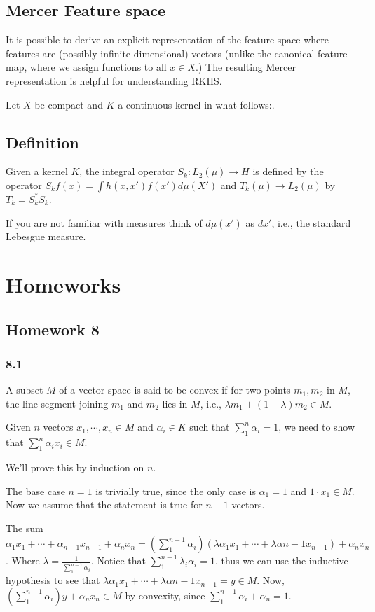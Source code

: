 \documentclass[11pt]{article}
\begin{document}
\subsection{Mercer Feature space}
\label{sec:orgb5b0f57}
It is possible to derive an explicit representation of the feature space
where features are (possibly infinite-dimensional) vectors (unlike the
canonical feature map, where we assign functions to all \(x \in X\).) The
resulting Mercer representation is helpful for understanding RKHS.

Let \(X\) be compact and \(K\) a continuous kernel in what follows:.
\subsection{Definition}
\label{sec:org1f91a46}
Given a kernel \(K\), the integral operator \(S_k \colon L_2(\mu) \rightarrow H\)
is defined by the operator \(S_k f(x) = \int h(x, x') f(x') d \mu(X')\) and
\(T_k(\mu) \rightarrow L_2(\mu)\) by \(T_k = S_k^{*} S_k\).

If you are not familiar with measures think of \(d \mu(x')\) as \(dx'\), i.e.,
the standard Lebesgue measure.
\section{Homeworks}
\label{sec:orga0bfbaf}
\subsection{Homework 8}
\label{sec:orgd9d3ffa}
\subsubsection{8.1}
\label{sec:orgb7b4d60}
A subset \(M\) of a vector space is said to be convex if for two points \(m_1,
    m_2\) in \(M\), the line segment joining \(m_1\) and \(m_2\) lies in \(M\), i.e.,
\(\lambda m_1 + (1-\lambda)m_2 \in M\).

Given \(n\) vectors \(x_1, \cdots, x_n\in M\) and \(\alpha_i \in K\) such that
\(\sum_1^n \alpha_i = 1\), we need to show that \(\sum_1^n \alpha_i x_i \in M\).

We'll prove this by induction on \(n\).

The base case \(n=1\) is trivially true, since the only case is \(\alpha_1 = 1\)
and \(1\cdot x_1 \in M\). Now we assume that the statement is true for \(n-1\)
vectors.

The sum \(\alpha_1x_1 + \cdots + \alpha_{n-1}x_{n-1} + \alpha_nx_n=
    (\sum_1^{n-1}\alpha_i)(\lambda\alpha_1 x_1 + \cdots +
    \lambda\alpha{n-1}x_{n-1}) + \alpha_n x_n\). Where \(\lambda =
    \frac{1}{\sum_1^{n-1} \alpha_i}\). Notice that \(\sum_1^{n-1} \lambda_i
    \alpha_i = 1\), thus we can use the inductive hypothesis to see that
\(\lambda\alpha_1 x_1 + \cdots + \lambda\alpha{n-1}x_{n-1} = y \in M\). Now,
\((\sum_1^{n-1}\alpha_i)y + \alpha_n x_n \in M\) by convexity, since
\(\sum_1^{n-1}\alpha_i + \alpha_n = 1\).
\end{document}
